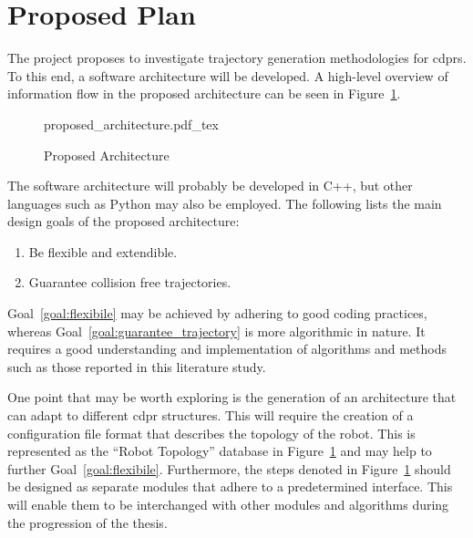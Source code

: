 \section{Proposed Plan}%
\label{sec:proposed_plan}

	The project proposes to investigate trajectory generation methodologies for
	\mbox{\glspl{cdpr}}. To this end, a software architecture will be developed.
	A high-level overview of information flow in the proposed architecture can
	be seen in Figure~\ref{fig:proposed_architecture}.

	\begin{figure}[hb]
		\centering
		\def\svgwidth{\columnwidth}
		{proposed_architecture.pdf_tex}
		\caption{Proposed Architecture}%
		\label{fig:proposed_architecture}
	\end{figure}

	The software architecture will probably be developed in C++, but other
	languages such as Python may also be employed. The following lists the main
	design goals of the proposed architecture:

	\begin{enumerate}

		\item\label{goal:flexibile}

			Be flexible and extendible.

		\item\label{goal:guarantee_trajectory}

			Guarantee collision free trajectories.

	\end{enumerate}

	Goal~\ref{goal:flexibile} may be achieved by adhering to good coding
	practices, whereas Goal~\ref{goal:guarantee_trajectory} is more algorithmic
	in nature. It requires a good understanding and implementation of algorithms
	and methods such as those reported in this literature study.

	One point that may be worth exploring is the generation of an architecture
	that can adapt to different \gls{cdpr} structures. This will require the
	creation of a configuration file format that describes the topology of the
	robot. This is represented as the ``Robot Topology'' database in
	Figure~\ref{fig:proposed_architecture} and may help to further
	Goal~\ref{goal:flexibile}. Furthermore, the steps denoted in
	Figure~\ref{fig:proposed_architecture} should be designed as separate
	modules that adhere to a predetermined interface. This will enable them to
	be interchanged with other modules and algorithms during the progression of
	the thesis.

